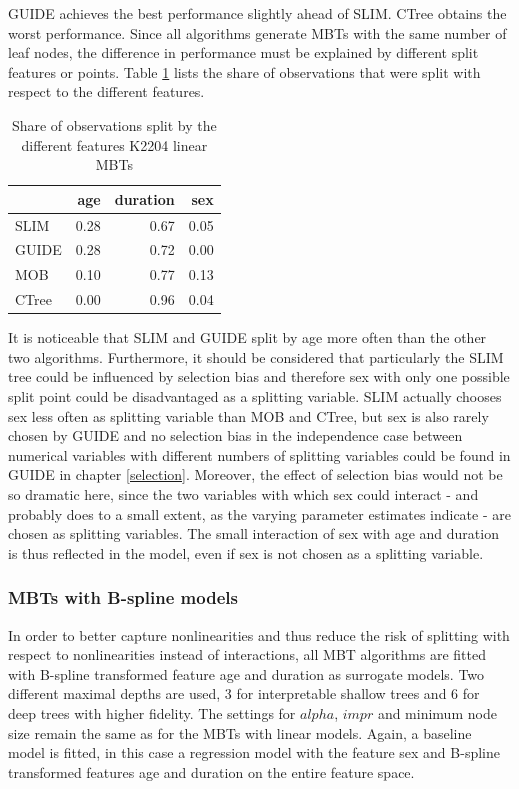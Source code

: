 GUIDE achieves the best performance slightly ahead of SLIM. CTree obtains the worst performance.
Since all algorithms generate MBTs with the same number of leaf nodes, the difference in performance must be explained by different split features or points.
Table \ref{tab:ins_k2204_lm_surrogates_share} lists the share of observations that were split with respect to the different features.

\begin{table}[!htb]

\centering \scriptsize
\begin{tabular}[t]{l|r|r|r}
\hline
& age & duration & sex\\
\hline
SLIM & 0.28 & 0.67 & 0.05\\
GUIDE & 0.28 & 0.72 & 0.00\\
MOB & 0.10 & 0.77 & 0.13\\
CTree & 0.00 & 0.96 & 0.04\\
\hline
\end{tabular}
\caption{Share of observations split by the different features K2204 linear MBTs}
\label{tab:ins_k2204_lm_surrogates_share}
\end{table}


It is noticeable that SLIM and GUIDE split by age more often than the other two algorithms.
Furthermore, it should be considered that particularly the SLIM tree could be influenced by selection bias and therefore sex with only one possible split point could be disadvantaged as a splitting variable. SLIM actually chooses sex less often as splitting variable than MOB and CTree, but sex is also rarely chosen by GUIDE and no selection bias in the independence case between numerical variables with different numbers of splitting variables could be found in GUIDE in chapter \ref{selection}. 
Moreover, the effect of selection bias would not be so dramatic here, since the two variables with which sex could interact - and probably does to a small extent, as the varying parameter estimates indicate - are chosen as splitting variables. The small interaction of sex with age and duration is thus reflected in the model, even if sex is not chosen as a splitting variable.

\subsubsection{MBTs with B-spline models}

In order to better capture nonlinearities and thus reduce the risk of splitting with respect to nonlinearities instead of interactions, all MBT algorithms are fitted with B-spline transformed feature age and duration as surrogate models. 
Two different maximal depths are used, 3 for interpretable shallow trees and 6 for deep trees with higher fidelity. The settings for $alpha$, $impr$ and minimum node size remain the same as for the MBTs with linear models.  Again, a baseline model is fitted, in this case a regression model with the feature sex and B-spline transformed features age and duration on the entire feature space. 

